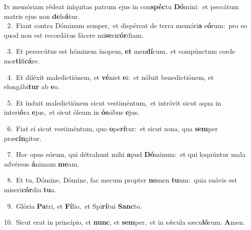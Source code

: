 \lettrine{\initial\textcolor{\initialcolor}{I}}{n} memóriam rédeat iníquitas patrum ejus in con\-\textbf{spéc}\-tu \textbf{Dó}\-mini:~\star et peccátum matris ejus non \textbf{de}\-le\-\textbf{á}\-tur.\\
{\numbfont\textcolor{\numbcolor}{~2.}}~Fiant contra Dóminum semper,~\dagger et dispéreat de terra memóri\textbf{a} e\-\textbf{ó}\-rum:~\star pro eo quod non est recordátus fácere mi\-\textbf{se}\-ri\-\textbf{cór}\-diam.\par
{\numbfont\textcolor{\numbcolor}{~3.}}~Et persecútus est hóminem ínopem, \textbf{et} men\-\textbf{dí}\-cum,~\star et compúnctum corde mor\-\textbf{ti}\-fi\-\textbf{cá}\-re.\par
{\numbfont\textcolor{\numbcolor}{~4.}}~Et diléxit maledictiónem, et \textbf{vé}\-niet \textbf{e}\-i:~\star et nóluit benedictiónem, et elongábi\textbf{tur} ab \textbf{e}\-o.\par
{\numbfont\textcolor{\numbcolor}{~5.}}~Et índuit maledictiónem sicut vestiméntum,~\dagger et intrávit sicut aqua in interi\-\textbf{ó}\-ra \textbf{e}\-jus,~\star et sicut óleum in \textbf{ós}\-sibus \textbf{e}\-jus.\par
{\numbfont\textcolor{\numbcolor}{~6.}}~Fiat ei sicut vestiméntum, quo \textbf{o}\-pe\-\textbf{rí}\-tur:~\star et sicut zona, qua \textbf{sem}\-per præ\-\textbf{cín}\-gitur.\par
{\numbfont\textcolor{\numbcolor}{~7.}}~Hoc opus eórum, qui détrahunt mihi \textbf{a}\-pud \textbf{Dó}\-minum:~\star et qui loquúntur mala advérsus \textbf{á}\-nimam \textbf{me}\-am.\par
{\numbfont\textcolor{\numbcolor}{~8.}}~Et tu, Dómine, Dómine, fac mecum propter \textbf{no}\-men \textbf{tu}\-um:~\star quia suávis est miseri\-\textbf{cór}\-dia \textbf{tu}\-a.\par
{\numbfont\textcolor{\numbcolor}{~9.}}~Glória \textbf{Pa}\-tri, et \textbf{Fí}\-lio,~\star et Spi\-\textbf{rí}\-tui \textbf{Sanc}\-to.\par
{\numbfont\textcolor{\numbcolor}{10.}}~Sicut erat in princípio, et \textbf{nunc}\-, et \textbf{sem}\-per,~\star et in sǽcula sæcu\-\textbf{ló}\-rum. \textbf{A}\-men.\par
